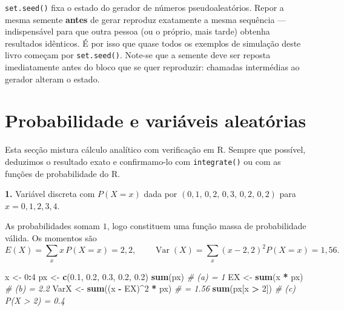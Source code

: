 \documentclass[
  portuguese,
  11pt,
  openany]{book}
\newenvironment{Shaded}{\begin{snugshade}}{\end{snugshade}}
\newcommand{\CommentTok}[1]{\textcolor[rgb]{0.56,0.35,0.01}{\textit{#1}}}
\newcommand{\DecValTok}[1]{\textcolor[rgb]{0.00,0.00,0.81}{#1}}
\newcommand{\FloatTok}[1]{\textcolor[rgb]{0.00,0.00,0.81}{#1}}
\newcommand{\FunctionTok}[1]{\textcolor[rgb]{0.13,0.29,0.53}{\textbf{#1}}}
\newcommand{\NormalTok}[1]{#1}
\newcommand{\OtherTok}[1]{\textcolor[rgb]{0.56,0.35,0.01}{#1}}
\newcommand{\SpecialCharTok}[1]{\textcolor[rgb]{0.81,0.36,0.00}{\textbf{#1}}}
\begin{document}
\texttt{set.seed()} fixa o estado do gerador de números pseudoaleatórios. Repor a mesma
semente \textbf{antes} de gerar reproduz exatamente a mesma sequência --- indispensável
para que outra pessoa (ou o próprio, mais tarde) obtenha resultados idênticos. É
por isso que quase todos os exemplos de simulação deste livro começam por
\texttt{set.seed()}. Note-se que a semente deve ser reposta imediatamente antes do bloco
que se quer reproduzir: chamadas intermédias ao gerador alteram o estado.

\section{Probabilidade e variáveis aleatórias}\label{probabilidade-e-variuxe1veis-aleatuxf3rias}

Esta secção mistura cálculo analítico com verificação em R. Sempre que possível,
deduzimos o resultado exato e confirmamo-lo com \texttt{integrate()} ou com as funções
de probabilidade do R.

\textbf{1.} Variável discreta com \(P(X=x)\) dada por \((0{,}1,\,0{,}2,\,0{,}3,\,0{,}2,\,0{,}2)\)
para \(x = 0, 1, 2, 3, 4\).

As probabilidades somam \(1\), logo constituem uma função massa de probabilidade
válida. Os momentos são
\[E(X) = \sum_x x\,P(X=x) = 2{,}2, \qquad
\operatorname{Var}(X) = \sum_x (x - 2{,}2)^2 P(X=x) = 1{,}56.\]

\begin{Shaded}
\begin{Highlighting}[]
\NormalTok{x  }\OtherTok{\textless{}{-}} \DecValTok{0}\SpecialCharTok{:}\DecValTok{4}
\NormalTok{px }\OtherTok{\textless{}{-}} \FunctionTok{c}\NormalTok{(}\FloatTok{0.1}\NormalTok{, }\FloatTok{0.2}\NormalTok{, }\FloatTok{0.3}\NormalTok{, }\FloatTok{0.2}\NormalTok{, }\FloatTok{0.2}\NormalTok{)}
\FunctionTok{sum}\NormalTok{(px)                        }\CommentTok{\# (a) = 1}
\NormalTok{EX  }\OtherTok{\textless{}{-}} \FunctionTok{sum}\NormalTok{(x }\SpecialCharTok{*}\NormalTok{ px)             }\CommentTok{\# (b) = 2.2}
\NormalTok{VarX }\OtherTok{\textless{}{-}} \FunctionTok{sum}\NormalTok{((x }\SpecialCharTok{{-}}\NormalTok{ EX)}\SpecialCharTok{\^{}}\DecValTok{2} \SpecialCharTok{*}\NormalTok{ px)   }\CommentTok{\#      = 1.56}
\FunctionTok{sum}\NormalTok{(px[x }\SpecialCharTok{\textgreater{}} \DecValTok{2}\NormalTok{])                 }\CommentTok{\# (c) P(X \textgreater{} 2) = 0.4}
\end{Highlighting}
\end{Shaded}
\end{document}
